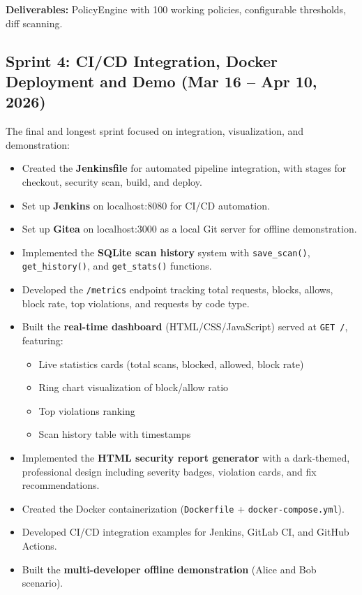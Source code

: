 \noindent\textbf{Deliverables:} PolicyEngine with 100 working policies, configurable thresholds, diff scanning.


\subsection*{Sprint 4: CI/CD Integration, Docker Deployment and Demo (Mar 16 -- Apr 10, 2026)}

The final and longest sprint focused on integration, visualization, and demonstration:

\begin{itemize}
    \item Created the \textbf{Jenkinsfile} for automated pipeline integration, with stages for checkout, security scan, build, and deploy.
    \item Set up \textbf{Jenkins} on localhost:8080 for CI/CD automation.
    \item Set up \textbf{Gitea} on localhost:3000 as a local Git server for offline demonstration.
    \item Implemented the \textbf{SQLite scan history} system with \texttt{save\_scan()}, \texttt{get\_history()}, and \texttt{get\_stats()} functions.
    \item Developed the \texttt{/metrics} endpoint tracking total requests, blocks, allows, block rate, top violations, and requests by code type.
    \item Built the \textbf{real-time dashboard} (HTML/CSS/JavaScript) served at \texttt{GET /}, featuring:
    \begin{itemize}
        \item Live statistics cards (total scans, blocked, allowed, block rate)
        \item Ring chart visualization of block/allow ratio
        \item Top violations ranking
        \item Scan history table with timestamps
    \end{itemize}
    \item Implemented the \textbf{HTML security report generator} with a dark-themed, professional design including severity badges, violation cards, and fix recommendations.
    \item Created the Docker containerization (\texttt{Dockerfile} + \texttt{docker-compose.yml}).
    \item Developed CI/CD integration examples for Jenkins, GitLab CI, and GitHub Actions.
    \item Built the \textbf{multi-developer offline demonstration} (Alice and Bob scenario).
\end{itemize}

